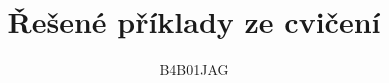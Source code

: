 \documentclass[11pt]{article}
\begin{document}
 
\title{\textbf{Řešené příklady ze cvičení}}
\author{B4B01JAG}
\maketitle





 
\end{document}
